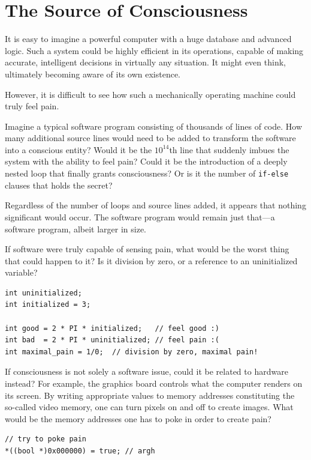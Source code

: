 \chapter{The Source of Consciousness}
\label{chap:source-of-consciousness}
\label{chap:typical-software}
\label{chap:qualia}

It is easy to imagine a powerful computer with a huge database and advanced logic. 
Such a system could be highly efficient in its operations, capable of making accurate, intelligent decisions in virtually any situation. It might even think, ultimately becoming aware of its own existence.

However, it is difficult to see how such a mechanically operating machine could truly feel pain.

Imagine a typical software program consisting of thousands of lines of code. How many additional source lines would need to be added to 
transform the software into a conscious entity? Would it be the $10^{14}$th line that suddenly imbues the system with the ability to feel pain? 
Could it be the introduction of a deeply nested loop that finally grants consciousness? Or is it the number of \texttt{if-else} clauses that holds the secret?

Regardless of the number of loops and source lines added, it appears that nothing significant would occur. 
The software program would remain just that---a software program, albeit larger in size.

If software were truly capable of sensing pain, what would be the worst thing that could happen to it? 
Is it division by zero, or a reference to an uninitialized variable?

\begin{verbatim}
int uninitialized;
int initialized = 3;

int good = 2 * PI * initialized;   // feel good :)
int bad  = 2 * PI * uninitialized; // feel pain :(
int maximal_pain = 1/0;  // division by zero, maximal pain!
\end{verbatim}

If consciousness is not solely a software issue, could it be related to hardware instead? For example, the graphics board controls what the 
computer renders on its screen. By writing appropriate values to memory addresses constituting the so-called video memory, one can turn pixels 
on and off to create images. What would be the memory addresses one has to poke in order to create pain?

\begin{verbatim}
// try to poke pain
*((bool *)0x000000) = true; // argh
\end{verbatim}


